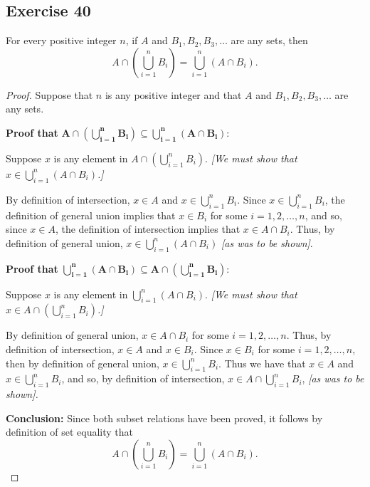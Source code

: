 \documentclass[14pt]{extarticle}
\newcommand{\dps}{\displaystyle}
\begin{document}
\subsection{Exercise 40}
For every positive integer $n$, if $A$ and \(B_1, B_2, B_3, \ldots\) are any sets, then
\[
A \cap \left(\bigcup_{i=1}^n B_i\right) = \bigcup_{i=1}^n (A \cap B_i).
\]
\begin{proof}
Suppose that $n$ is any positive integer and that $A$ and \(B_1, B_2, B_3, \ldots\) are any sets.

{\bf Proof that} \(\bm{A \cap \left(\bigcup_{i=1}^n B_i\right) \subseteq \bigcup_{i=1}^n (A \cap B_i):}\) 

Suppose $x$ is any element in \(\dps A \cap \left( \bigcup_{i=1}^n B_i\right)\). 
{\it [We must show that \(\dps x \in \bigcup_{i=1}^n (A \cap B_i)\).]}

By definition of intersection, $x \in A$ and \(\dps x \in \bigcup_{i=1}^n B_i\). Since \(\dps x \in \bigcup_{i=1}^n 
B_i\), the definition of general union implies that \(x \in B_i\) for some \(i = 1, 2, \ldots, n\), and so, since \(x 
\in A\), the definition of intersection implies that \(x \in A \cap B_i\). Thus, by definition of general union, 
\(\dps x \in \bigcup_{i=1}^n (A \cap B_i)\) {\it [as was to be shown]}.

{\bf Proof that} \(\bm{\bigcup_{i=1}^n (A \cap B_i) \subseteq A \cap \left(\bigcup_{i=1}^n B_i\right):}\) 

Suppose $x$ is any element in \(\dps \bigcup_{i=1}^n (A \cap B_i)\). 
{\it [We must show that \(\dps x \in A \cap \left( \bigcup_{i=1}^n B_i\right)\).]}

By definition of general union, \(x \in A \cap B_i\) for some \(i = 1, 2, \ldots, n\). Thus, by definition of 
intersection, \(x \in A\) and \(x \in B_i\). Since \(x \in B_i\) for some \(i = 1, 2, \ldots, n\), then by definition 
of general union, \(\dps x \in \bigcup_{i=1}^n B_i\). Thus we have that \(x \in A\) and \(\dps x \in \bigcup_{i=1}^n 
B_i\), and so, by definition of intersection, \(\dps x \in A \cap \bigcup_{i=1}^n B_i\), {\it [as was to be shown].} 

{\bf Conclusion:} Since both subset relations have been proved, it follows by definition of set equality that 
\[
A \cap \left(\bigcup_{i=1}^n B_i\right) = \bigcup_{i=1}^n (A \cap B_i).
\]
\end{proof}
\end{document}
